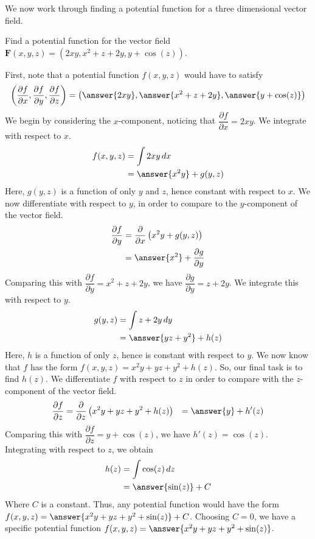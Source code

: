\documentclass{ximera}
\begin{document}
We now work through finding a potential function for a three dimensional vector field.

\begin{example}
Find a potential function for the vector field $\mathbf{F}(x,y,z)=(2xy,x^2+z+2y,y+\cos(z))$.
\begin{explanation}
First, note that a potential function $f(x,y,z)$ would have to satisfy
\[
\left(\dfrac{\partial f}{\partial x}, \dfrac{\partial f}{\partial y}, \dfrac{\partial f}{\partial z}\right) = \left(\answer{2xy},\answer{x^2+z+2y},\answer{y+\cos(z)}\right)
\]
We begin by considering the $x$-component, noticing that $\dfrac{\partial f}{\partial x} = 2xy$. We integrate with respect to $x$.
\begin{align*}
f(x,y,z) &= \int 2xy\,dx\\
&= \answer{x^2y} + g(y,z)
\end{align*}
Here, $g(y,z)$ is a function of only $y$ and $z$, hence constant with respect to $x$. We now differentiate with respect to $y$, in order to compare to the $y$-component of the vector field.
\begin{align*}
\dfrac{\partial f}{\partial y} &= \dfrac{\partial}{\partial x}\left(x^2y+g(y,z)\right)\\
&= \answer{x^2}+\dfrac{\partial g}{\partial y}
\end{align*}
Comparing this with $\dfrac{\partial f}{\partial y} = x^2+z+2y$, we have $\dfrac{\partial g}{\partial y} = z+2y$. We integrate this with respect to $y$.
\begin{align*}
g(y,z) &= \int z+2y\,dy\\
&= \answer{yz+y^2}+h(z)
\end{align*}
Here, $h$ is a function of only $z$, hence is constant with respect to $y$. We now know that $f$ has the form $f(x,y,z) = x^2y+yz+y^2+h(z)$. So, our final task is to find $h(z)$. We differentiate $f$ with respect to $z$ in order to compare with the $z$-component of the vector field.
\begin{align*}
\dfrac{\partial f}{\partial z} &= \dfrac{\partial}{\partial z}\left(x^2y+yz+y^2+h(z)\right)
&= \answer{y}+h'(z)
\end{align*}
Comparing this with $\dfrac{\partial f}{\partial z} = y+\cos(z)$, we have $h'(z)=\cos(z)$. Integrating with respect to $z$, we obtain
\begin{align*}
h(z) &= \int \cos(z)\,dz\\
&=\answer{\sin(z)}+C
\end{align*}
Where $C$ is a constant. Thus, any potential function would have the form $f(x,y,z) = \answer{x^2y+yz+y^2+\sin(z)}+C$. Choosing $C=0$, we have a specific potential function $f(x,y,z)= \answer{x^2y+yz+y^2+\sin(z)}$.
\end{explanation}
\end{example}
\end{document}
